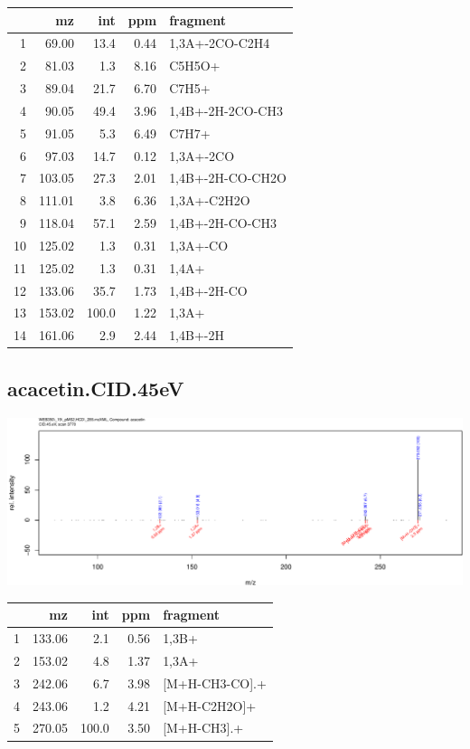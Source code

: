 \documentclass[]{article}
\begin{document}
\begin{table}[ht]
\centering
\begin{tabular}{rrrrl}
  \toprule
 & mz & int & ppm & fragment \\ 
  \midrule
1 & 69.00 & 13.4 & 0.44 & 1,3A+-2CO-C2H4 \\ 
  2 & 81.03 & 1.3 & 8.16 & C5H5O+ \\ 
  3 & 89.04 & 21.7 & 6.70 & C7H5+ \\ 
  4 & 90.05 & 49.4 & 3.96 & 1,4B+-2H-2CO-CH3 \\ 
  5 & 91.05 & 5.3 & 6.49 & C7H7+ \\ 
  6 & 97.03 & 14.7 & 0.12 & 1,3A+-2CO \\ 
  7 & 103.05 & 27.3 & 2.01 & 1,4B+-2H-CO-CH2O \\ 
  8 & 111.01 & 3.8 & 6.36 & 1,3A+-C2H2O \\ 
  9 & 118.04 & 57.1 & 2.59 & 1,4B+-2H-CO-CH3 \\ 
  10 & 125.02 & 1.3 & 0.31 & 1,3A+-CO \\ 
  11 & 125.02 & 1.3 & 0.31 & 1,4A+ \\ 
  12 & 133.06 & 35.7 & 1.73 & 1,4B+-2H-CO \\ 
  13 & 153.02 & 100.0 & 1.22 & 1,3A+ \\ 
  14 & 161.06 & 2.9 & 2.44 & 1,4B+-2H \\ 
   \bottomrule
\end{tabular}
\end{table}

\clearpage\subsection{acacetin.CID.45eV}
\includegraphics[width=\textwidth]{WEB350_files/figure-latex/unnamed-chunk-3-37}

\begin{table}[ht]
\centering
\begin{tabular}{rrrrl}
  \toprule
 & mz & int & ppm & fragment \\ 
  \midrule
1 & 133.06 & 2.1 & 0.56 & 1,3B+ \\ 
  2 & 153.02 & 4.8 & 1.37 & 1,3A+ \\ 
  3 & 242.06 & 6.7 & 3.98 & [M+H-CH3-CO].+ \\ 
  4 & 243.06 & 1.2 & 4.21 & [M+H-C2H2O]+ \\ 
  5 & 270.05 & 100.0 & 3.50 & [M+H-CH3].+ \\ 
   \bottomrule
\end{tabular}
\end{table}
\end{document}
